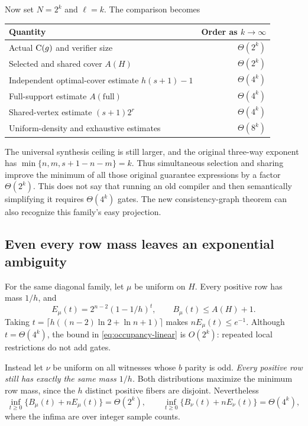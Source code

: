 Now set $N=2^k$ and $\ell=k$. The comparison becomes
\begin{center}
\begin{tabular}{@{}lr@{}}
\toprule
Quantity & Order as $k\to\infty$\\
\midrule
Actual $\mathrm{C}(g)$ and verifier size & $\Theta(2^k)$\\
Selected and shared cover $A(H)$ & $\Theta(2^k)$\\
Independent optimal-cover estimate $h(s+1)-1$ & $\Theta(4^k)$\\
Full-support estimate $A(\text{full})$ & $\Theta(4^k)$\\
Shared-vertex estimate $(s+1)2^r$ & $\Theta(4^k)$\\
Uniform-density and exhaustive estimates & $\Theta(8^k)$\\
\bottomrule
\end{tabular}
\end{center}
The universal synthesis ceiling is still larger, and the original
three-way exponent has $\min\{n,m,s+1-n-m\}=k$. Thus simultaneous
selection and sharing improve the minimum of all those original
guarantee expressions by a factor $\Theta(2^k)$. This does not say
that running an old compiler and then semantically simplifying it
requires $\Theta(4^k)$ gates. The new consistency-graph theorem can
also recognize this family's easy projection.

\subsection{Even every row mass leaves an exponential ambiguity}
\label{sec:row-mass-gap}

For the same diagonal family, let $\mu$ be uniform on $H$. Every
positive row has mass $1/h$, and
\[
 E_\mu(t)=2^{n-2}(1-1/h)^t,\qquad B_\mu(t)\le A(H)+1.
\]
Taking $t=\lceil h((n-2)\ln2+\ln n+1)\rceil$ makes
$nE_\mu(t)\le e^{-1}$. Although $t=\Theta(4^k)$, the bound in
\eqref{eq:occupancy-linear} is $O(2^k)$: repeated local restrictions
do not add gates.

Instead let $\nu$ be uniform on all witnesses whose $b$ parity is odd.
\emph{Every positive row still has exactly the same mass $1/h$.}
Both distributions maximize the minimum row mass, since the $h$
distinct positive fibers are disjoint. Nevertheless
\begin{equation}\label{eq:row-mass-gap}
 \inf_{t\ge0}\{B_\mu(t)+nE_\mu(t)\}=\Theta(2^k),
 \qquad
 \inf_{t\ge0}\{B_\nu(t)+nE_\nu(t)\}=\Theta(4^k),
\end{equation}
where the infima are over integer sample counts.

